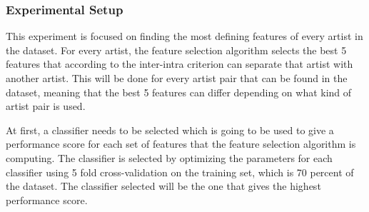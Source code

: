 %
%
%

\subsubsection{Experimental Setup}

This experiment is focused on finding the most defining features of every artist in the dataset.
For every artist, the feature selection algorithm selects the best 5 features that according to the inter-intra criterion can separate that artist with another artist.
This will be done for every artist pair that can be found in the dataset, meaning that the best 5 features can differ depending on what kind of artist pair is used.

At first, a classifier needs to be selected which is going to be used to give a performance score for each set of features that the feature selection algorithm is computing.
The classifier is selected by optimizing the parameters for each classifier using 5 fold cross-validation on the training set, which is 70 percent of the dataset.
The classifier selected will be the one that gives the highest performance score.

